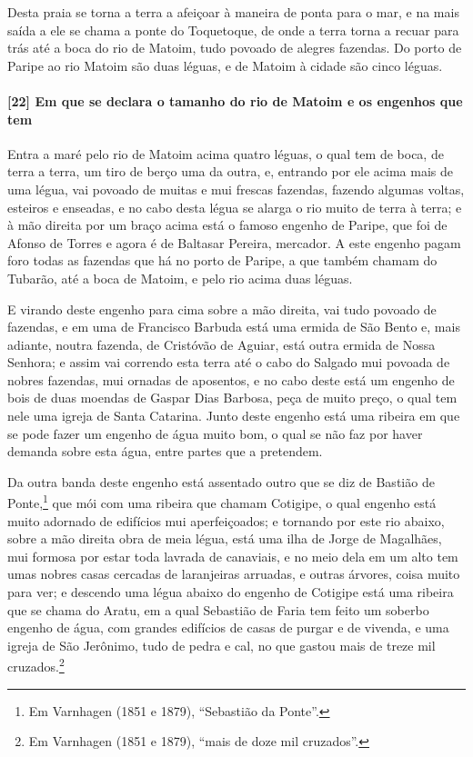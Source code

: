 Desta praia se torna a terra a afeiçoar à maneira de ponta para o mar, e na mais saída a
ele se chama a ponte do Toquetoque, de onde a terra torna a recuar para trás até a boca do
rio de Matoim, tudo povoado de alegres fazendas. Do porto de Paripe ao rio Matoim são duas
léguas, e de Matoim à cidade são cinco léguas.

\paragraph{[22] Em que se declara o tamanho do rio de Matoim e os engenhos que tem}\quad
Entra a maré pelo rio de Matoim acima quatro léguas, o qual tem de boca, de terra a terra,
um tiro de berço uma da outra, e, entrando por ele acima mais de uma légua, vai povoado de
muitas e mui frescas fazendas, fazendo algumas voltas, esteiros e enseadas, e no cabo
desta légua se alarga o rio muito de terra à terra; e à mão direita por um braço acima
está o famoso engenho de Paripe, que foi de Afonso de Torres e agora é de Baltasar
Pereira, mercador. A este engenho pagam foro todas as fazendas que há no porto de Paripe,
a que também chamam do Tubarão, até a boca de Matoim, e pelo rio acima duas léguas.

E virando deste engenho para cima sobre a mão direita, vai tudo povoado de fazendas, e em
uma de Francisco Barbuda está uma ermida de São Bento e, mais adiante, noutra fazenda, de
Cristóvão de Aguiar, está outra ermida de Nossa Senhora; e assim vai correndo esta terra
até o cabo do Salgado mui povoada de nobres fazendas, mui ornadas de aposentos, e no cabo
deste está um engenho de bois de duas moendas de Gaspar Dias Barbosa, peça de muito preço,
o qual tem nele uma igreja de Santa Catarina. Junto deste engenho está uma ribeira em que
se pode fazer um engenho de água muito bom, o qual se não faz por haver demanda sobre esta
água, entre partes que a pretendem.

Da outra banda deste engenho está assentado outro que se diz de Bastião de
Ponte,\footnote{ Em Varnhagen (1851 e 1879), ``Sebastião da Ponte''.} que mói com uma
ribeira que chamam Cotigipe, o qual engenho está muito adornado de edifícios mui
aperfeiçoados; e tornando por este rio abaixo, sobre a mão direita obra de meia légua,
está uma ilha de Jorge de Magalhães, mui formosa por estar toda lavrada de canaviais, e no
meio dela em um alto tem umas nobres casas cercadas de laranjeiras arruadas, e outras
árvores, coisa muito para ver; e descendo uma légua abaixo do engenho de Cotigipe está uma
ribeira que se chama do Aratu, em a qual Sebastião de Faria tem feito um soberbo engenho
de água, com grandes edifícios de casas de purgar e de vivenda, e uma igreja de São
Jerônimo, tudo de pedra e cal, no que gastou mais de treze mil cruzados.\footnote{ Em
Varnhagen (1851 e 1879), ``mais de doze mil cruzados''.}


